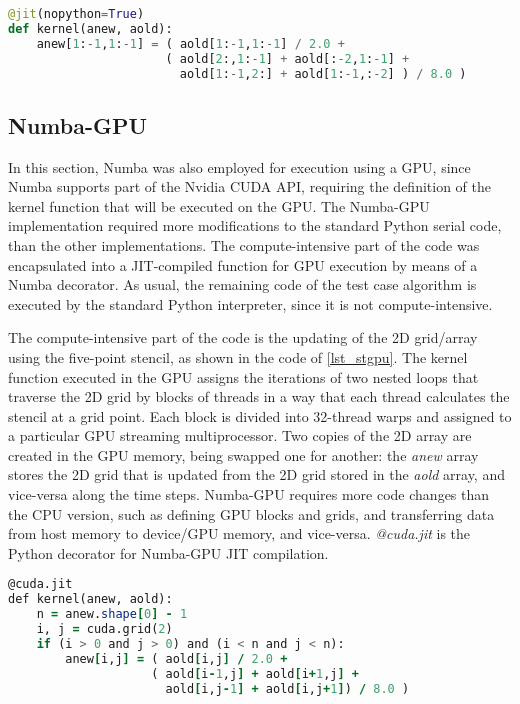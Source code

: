 \begin{lstlisting}[float=hbt, language=Python, label=lst_stnum, caption={Compute-intensive part of the Numba implementation.}]
@jit(nopython=True)
def kernel(anew, aold):
    anew[1:-1,1:-1] = ( aold[1:-1,1:-1] / 2.0 +
                      ( aold[2:,1:-1] + aold[:-2,1:-1] +
                        aold[1:-1,2:] + aold[1:-1,:-2] ) / 8.0 )
\end{lstlisting}

%
%
%
\subsection{Numba-GPU} %
\label{sec_stenimplngpu}

In this section, Numba was also employed for execution using a GPU, since Numba supports part of the Nvidia CUDA API, requiring the definition of the kernel function that will be executed on the GPU. The Numba-GPU implementation required more modifications to the standard Python serial code, than the other implementations. The compute-intensive part of the code was encapsulated into a JIT-compiled function for GPU execution by means of a Numba decorator. As usual, the remaining code of the test case algorithm is executed by the standard Python interpreter, since it is not compute-intensive.

The compute-intensive part of the code is the updating of the 2D grid/array using the five-point stencil, as shown in the code of \autoref {lst_stgpu}. The kernel function executed in the GPU assigns the iterations of two nested loops that traverse the 2D grid by blocks of threads in a way that each thread calculates the stencil at a grid point. Each block is divided into 32-thread warps and assigned to a particular GPU streaming multiprocessor. Two copies of the 2D array are created in the GPU memory, being swapped one for another: the \textit {anew} array stores the 2D grid that is updated from the 2D grid stored in the \textit {aold} array, and vice-versa along the time steps. Numba-GPU requires more code changes than the CPU version, such as defining GPU blocks and grids, and transferring data from host memory to device/GPU memory, and vice-versa. \textit {@cuda.jit} is the Python decorator for Numba-GPU JIT compilation.

\begin{lstlisting}[float=hbt, language=Fortran, label={lst_stgpu}, caption={Compute-intensive part of the Numba-GPU implementation.}]
@cuda.jit
def kernel(anew, aold):
    n = anew.shape[0] - 1
    i, j = cuda.grid(2)
    if (i > 0 and j > 0) and (i < n and j < n):
        anew[i,j] = ( aold[i,j] / 2.0 + 
                    ( aold[i-1,j] + aold[i+1,j] +
                      aold[i,j-1] + aold[i,j+1]) / 8.0 )
\end{lstlisting}

